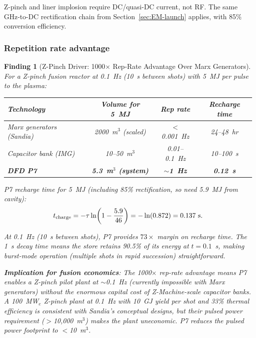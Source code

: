 \documentclass[11pt]{article}
\newtheorem{finding}{Finding}
\begin{document}
Z-pinch and liner implosion require DC/quasi-DC current, not RF.
The same GHz-to-DC rectification chain from Section~\ref{sec:EM-launch}
applies, with 85\% conversion efficiency.

\subsubsection{Repetition rate advantage}

\begin{finding}[Z-Pinch Driver: 1000$\times$ Rep-Rate Advantage Over Marx Generators]
\label{find:zpinch}
For a Z-pinch fusion reactor at 0.1~Hz (10~s between shots) with
5~MJ per pulse to the plasma:

\begin{center}
\begin{tabular}{lccc}
\toprule
Technology & Volume for 5~MJ & Rep rate & Recharge time \\
\midrule
Marx generators (Sandia) & 2000~m$^3$ (scaled) & $<$0.001~Hz & 24--48~hr \\
Capacitor bank (IMG) & 10--50~m$^3$ & 0.01--0.1~Hz & 10--100~s \\
\textbf{DFD P7} & \textbf{5.3~m$^3$ (system)} & \textbf{$\sim$1~Hz} & \textbf{0.12~s} \\
\bottomrule
\end{tabular}
\end{center}

P7 recharge time for 5~MJ (including 85\% rectification, so need
5.9~MJ from cavity):
\begin{equation}
t_{\rm charge} = -\tau\ln\!\left(1 - \frac{5.9}{46}\right)
= -\ln(0.872) = 0.137~\text{s}.
\end{equation}

At 0.1~Hz (10~s between shots), P7 provides $73\times$ margin on
recharge time. The 1~s decay time means the store retains 90.5\%
of its energy at $t = 0.1$~s, making burst-mode operation
(multiple shots in rapid succession) straightforward.

\textbf{Implication for fusion economics}: The 1000$\times$ rep-rate
advantage means P7 enables a Z-pinch pilot plant at $\sim$0.1~Hz
(currently impossible with Marx generators) without the enormous
capital cost of Z-Machine-scale capacitor banks. A 100~MW$_e$ Z-pinch
plant at 0.1~Hz with 10~GJ yield per shot and 33\% thermal efficiency
is consistent with Sandia's conceptual designs, but their pulsed power
requirement ($>$10,000~m$^3$) makes the plant uneconomic. P7 reduces
the pulsed power footprint to $<$10~m$^3$.
\end{finding}
\end{document}
